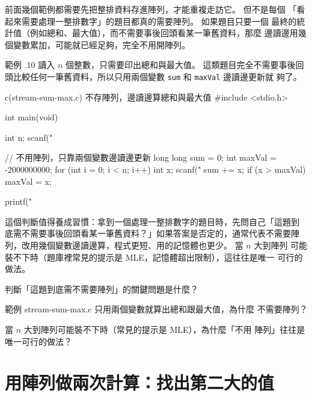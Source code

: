 前面幾個範例都需要先把整排資料存進陣列，才能重複走訪它。 但不是每個
「看起來需要處理一整排數字」的題目都真的需要陣列。 如果題目只要一個
最終的統計值（例如總和、最大值），而不需要事後回頭看某一筆舊資料，那麼
邊讀邊用幾個變數累加，可能就已經足夠，完全不用開陣列。

範例 \thechapter.10 讀入 $n$ 個整數，只需要印出總和與最大值。 這類題目完全不需要事後回頭比較任何一筆舊資料，所以只用兩個變數 \texttt{sum} 和 \texttt{maxVal} 邊讀邊更新就
夠了。

\begin{example}{c}{(stream-sum-max.c) 不存陣列，邊讀邊算總和與最大值}
#include <stdio.h>

int main(void) {
    int n;
    scanf("%

    // 不用陣列，只靠兩個變數邊讀邊更新
    long long sum = 0;
    int maxVal = -2000000000;
    for (int i = 0; i < n; i++) {
        int x;
        scanf("%
        sum += x;
        if (x > maxVal) {
            maxVal = x;
        }
    }

    printf("%
}
\end{example}


這個判斷值得養成習慣：拿到一個處理一整排數字的題目時，先問自己「這題到
底需不需要事後回頭看某一筆舊資料？」如果答案是否定的，通常代表不需要陣
列，改用幾個變數邊讀邊算，程式更短、用的記憶體也更少。 當 $n$ 大到陣列
可能裝不下時（題庫裡常見的提示是 MLE，記憶體超出限制），這往往是唯一
可行的做法。


\begin{drills}[label=drills:array-stream-no-array]
\item 判斷「這題到底需不需要陣列」的關鍵問題是什麼？
\item 範例 stream-sum-max.c 只用兩個變數就算出總和跟最大值，為什麼
不需要陣列？
\item 當 $n$ 大到陣列可能裝不下時（常見的提示是 MLE），為什麼「不用
陣列」往往是唯一可行的做法？
\end{drills}

\section{用陣列做兩次計算：找出第二大的值}
\label{sec:array-second-largest}

